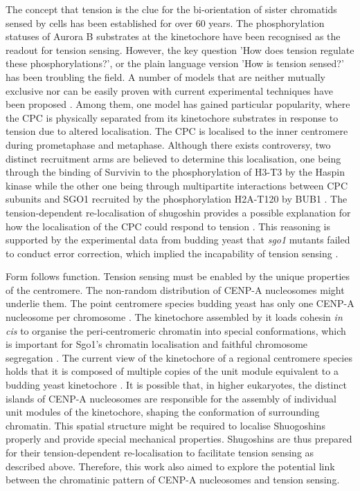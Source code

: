 The concept that tension is the clue for the bi-orientation of sister chromatids sensed by cells has been established for over 60 years. The phosphorylation statuses of Aurora B substrates at the kinetochore have been recognised as the readout for tension sensing. However, the key question 'How does tension regulate these phosphorylations?', or the plain language version 'How is tension sensed?' has been troubling the field. A number of models that are neither mutually exclusive nor can be easily proven with current experimental techniques have been proposed \citep{McVey2021AuroraSegregation}. Among them, one model has gained particular popularity, where the CPC is physically separated from its kinetochore substrates in response to tension due to altered localisation. The CPC is localised to the inner centromere during prometaphase and metaphase. Although there exists controversy, two distinct recruitment arms are believed to determine this localisation, one being through the binding of Survivin to the phosphorylation of H3-T3 by the Haspin kinase while the other one being through multipartite interactions between CPC subunits and SGO1 recruited by the phosphorylation H2A-T120 by BUB1 \citep{Abad2022MechanisticCPC}. The tension-dependent re-localisation of shugoshin provides a possible explanation for how the localisation of the CPC could respond to tension \citep{Nerusheva2014}. This reasoning is supported by the experimental data from budding yeast that \textit{sgo1} mutants failed to conduct error correction, which implied the incapability of tension sensing \citep{Indjeian2005a}. 

Form follows function. Tension sensing must be enabled by the unique properties of the centromere. The non-random distribution of CENP-A nucleosomes might underlie them. The point centromere species budding yeast has only one CENP-A nucleosome per chromosome \citep{Biggins2013TheKinetochore}. The kinetochore assembled by it loads cohesin \textit{in cis} to organise the peri-centromeric chromatin into special conformations, which is important for Sgo1's chromatin localisation and faithful chromosome segregation \citep{Paldi2020ConvergentPericentromeres, Fernius2009EstablishmentCsm3, Fernius2013Cohesin-DependentEstablishment, Hinshaw2015StructuralLoading, Hinshaw2017TheComplex, Natsume2013KinetochoresRecruitment}. The current view of the kinetochore of a regional centromere species holds that it is composed of multiple copies of the unit module equivalent to a budding yeast kinetochore \citep{Walstein2021}. It is possible that, in higher eukaryotes, the distinct islands of CENP-A nucleosomes are responsible for the assembly of individual unit modules of the kinetochore, shaping the conformation of surrounding chromatin. This spatial structure might be required to localise Shuogoshins properly and provide special mechanical properties. Shugoshins are thus prepared for their tension-dependent re-localisation to facilitate tension sensing as described above. Therefore, this work also aimed to explore the potential link between the chromatinic pattern of CENP-A nucleosomes and tension sensing. 